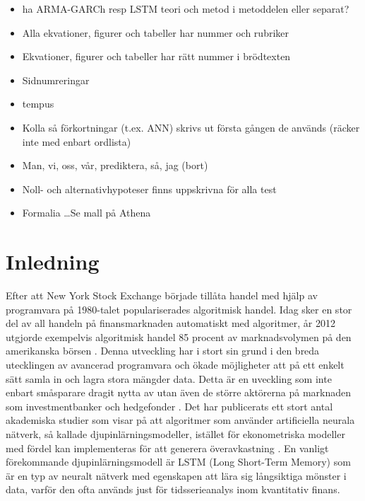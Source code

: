 \documentclass[11pt]{article}
\begin{document}
\newpage

\begin{itemize}
    \item ha ARMA-GARCh resp LSTM teori och metod i metoddelen eller separat?
    \item Alla ekvationer, figurer och tabeller har nummer och rubriker
    \item Ekvationer, figurer och tabeller har rätt nummer i brödtexten
    \item Sidnumreringar
    \item tempus
    \item Kolla så förkortningar (t.ex. ANN) skrivs ut första gången de används (räcker inte med enbart ordlista)
    \item Man, vi, oss, vår, prediktera, så, jag (bort)
    \item Noll- och alternativhypoteser finns uppskrivna för alla test
    \item Formalia \dots Se mall på Athena
\end{itemize}

\newpage
\clearpage
\setcounter{page}{1}

\section{Inledning}
Efter att New York Stock Exchange började tillåta handel med hjälp av programvara på 1980-talet populariserades algoritmisk handel.  Idag sker en stor del av all handeln på finansmarknaden automatiskt med algoritmer, år 2012 utgjorde exempelvis algoritmisk handel 85 procent av marknadsvolymen på den amerikanska börsen \parencite{glantz2013multi}. Denna utveckling har i stort sin grund i den breda utecklingen av avancerad programvara och ökade möjligheter att på ett enkelt sätt samla in och lagra stora mängder data. Detta är en uveckling som inte enbart småsparare dragit nytta av utan även de större aktörerna på marknaden som investmentbanker och hedgefonder \parencite{DE_Shaw}. Det har publicerats ett stort antal akademiska studier som visar på att algoritmer som använder artificiella neurala nätverk, så kallade djupinlärningsmodeller, istället för ekonometriska modeller med fördel kan implementeras för att generera överavkastning \parencite{paliwal2009neural}. En vanligt förekommande djupinlärningsmodell är LSTM (Long Short-Term Memory) som är en typ av neuralt nätverk med egenskapen att lära sig långsiktiga mönster i data, varför den ofta används just för tidsserieanalys inom kvantitativ finans.
\end{document}
